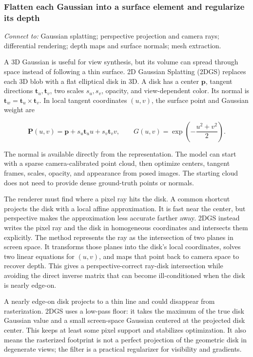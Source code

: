 \subsubsection{Flatten each Gaussian into a surface element and regularize its depth}\label{04-visual-computing-ii-ch034-flatten-each-gaussian-into-a-surface-element-and-regularize-its-depth}

\emph{Connect to:} Gaussian splatting; perspective projection and camera rays; differential rendering; depth maps and surface normals; mesh extraction.

A 3D Gaussian is useful for view synthesis, but its volume can spread through space instead of following a thin surface. 2D Gaussian Splatting (2DGS) replaces each 3D blob with a flat elliptical disk in 3D. A disk has a center \(\mathbf{p}\), tangent directions \(\mathbf{t}_u,\mathbf{t}_v\), two scales \(s_u,s_v\), opacity, and view-dependent color. Its normal is \(\mathbf{t}_w=\mathbf{t}_u\times\mathbf{t}_v\). In local tangent coordinates \((u,v)\), the surface point and Gaussian weight are

\[\mathbf{P}(u,v)=\mathbf{p}+s_u\mathbf{t}_u u+s_v\mathbf{t}_v v,\qquad G(u,v)=\exp\left(-\frac{u^2+v^2}{2}\right).\]

The normal is available directly from the representation. The model can start with a sparse camera-calibrated point cloud, then optimize centers, tangent frames, scales, opacity, and appearance from posed images. The starting cloud does not need to provide dense ground-truth points or normals.

The renderer must find where a pixel ray hits the disk. A common shortcut projects the disk with a local affine approximation. It is fast near the center, but perspective makes the approximation less accurate farther away. 2DGS instead writes the pixel ray and the disk in homogeneous coordinates and intersects them explicitly. The method represents the ray as the intersection of two planes in screen space. It transforms those planes into the disk's local coordinates, solves two linear equations for \((u,v)\), and maps that point back to camera space to recover depth. This gives a perspective-correct ray-disk intersection while avoiding the direct inverse matrix that can become ill-conditioned when the disk is nearly edge-on.

A nearly edge-on disk projects to a thin line and could disappear from rasterization. 2DGS uses a low-pass floor: it takes the maximum of the true disk Gaussian value and a small screen-space Gaussian centered at the projected disk center. This keeps at least some pixel support and stabilizes optimization. It also means the rasterized footprint is not a perfect projection of the geometric disk in degenerate views; the filter is a practical regularizer for visibility and gradients.

